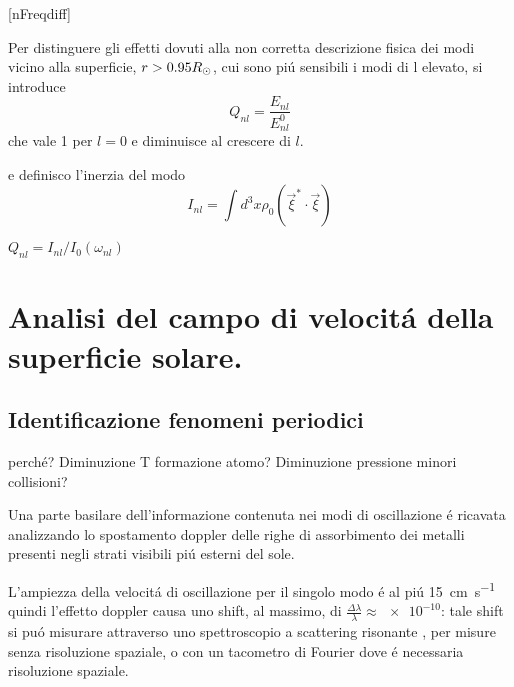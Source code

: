\documentclass[../main.tex]{subfiles}
\begin{document}
\begin{workout}

[nFreqdiff]

Per distinguere gli effetti dovuti alla non corretta descrizione fisica dei modi vicino alla superficie, $r>0.95R_{\odot}{}$, cui sono pi\'u sensibili i modi di l elevato, si introduce
\begin{equation}
Q_{nl}=\frac{E_{nl}}{E^0_{nl}}\label{eq:surfaceeffects}
\end{equation}
che vale 1 per $l=0$ e diminuisce al crescere di $l$.


 e definisco l'inerzia del modo
\begin{equation}
I_{nl}=\int d^3x\rho_0(\vec{\xi}^*\cdot\vec{\xi})\label{eq:modeinertia}
\end{equation}

$Q_{nl}=I_{nl}/I_{0}(\omega_{nl})$

\end{workout}



{\let\clearpage\relax\let\cleardoublepage\relax
\chapter{Analisi del campo di velocit\'a della superficie solare.}
}


\section{Identificazione fenomeni periodici}

\begin{workout}
perch\'e? Diminuzione T formazione atomo? Diminuzione pressione minori collisioni?
\end{workout}



Una parte basilare dell'informazione contenuta nei modi di oscillazione \'e ricavata analizzando  lo spostamento doppler delle righe di assorbimento dei metalli presenti negli strati visibili pi\'u esterni del sole.

L'ampiezza della velocit\'a di oscillazione per il singolo modo \'e  al pi\'u \SI{15}{\cm\per\second} quindi l'effetto doppler causa uno shift, al massimo, di $\frac{\Delta\lambda}{\lambda}\approx\num{e-10}$: tale shift si pu\'o misurare attraverso uno spettroscopio a scattering risonante  , per misure senza risoluzione spaziale, o con un tacometro di Fourier dove \'e necessaria risoluzione spaziale.
\end{document}
